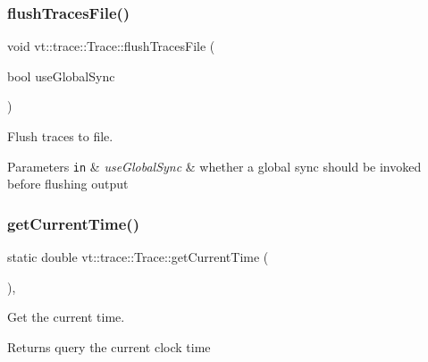 \mbox{\label{structvt_1_1trace_1_1_trace_a2e07094a48c47b9c591003f0b57305c7}} 
\subsubsection{\texorpdfstring{flush\+Traces\+File()}{flushTracesFile()}}
{\footnotesize\ttfamily void vt\+::trace\+::\+Trace\+::flush\+Traces\+File (\begin{DoxyParamCaption}\item[{bool}]{use\+Global\+Sync }\end{DoxyParamCaption})}



Flush traces to file. 


\begin{DoxyParams}[1]{Parameters}
\mbox{\tt in}  & {\em use\+Global\+Sync} & whether a global sync should be invoked before flushing output \\
\hline
\end{DoxyParams}
\mbox{\label{structvt_1_1trace_1_1_trace_a04cf6b76b4ced1bc90d246a34c948db5}} 
\subsubsection{\texorpdfstring{get\+Current\+Time()}{getCurrentTime()}}
{\footnotesize\ttfamily static double vt\+::trace\+::\+Trace\+::get\+Current\+Time (\begin{DoxyParamCaption}{ }\end{DoxyParamCaption})\hspace{0.3cm}{\ttfamily [inline]}, {\ttfamily [static]}}



Get the current time. 

\begin{DoxyReturn}{Returns}
query the current clock time 
\end{DoxyReturn}
\mbox{\label{structvt_1_1trace_1_1_trace_ae2e8213035c557a769cf0fd1a41533a5}} 
